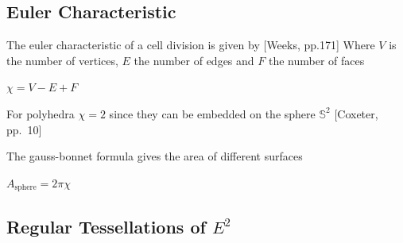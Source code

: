 \subsection{Euler Characteristic}\label{euler-characteristic}

The euler characteristic of a cell division is given by {[}Weeks,
pp.171{]} Where \(V\) is the number of vertices, \(E\) the number of
edges and \(F\) the number of faces

\(\chi = V - E + F\)

For polyhedra \(\chi=2\) since they can be embedded on the sphere
\(\mathbb{S}^2\) {[}Coxeter, pp.~10{]}

The gauss-bonnet formula gives the area of different surfaces

\(A_\text{sphere} = 2\pi\chi\)

\subsection{Regular Tessellations of $E^2$}

 